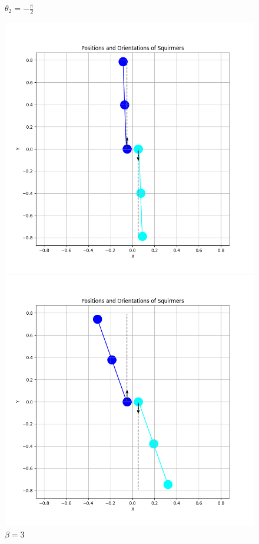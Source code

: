 \documentclass{article}
\begin{document}
\begin{figure}[H]
    \centering
    \textbf{$\theta_2 = -\frac{\pi}{2}$}\par\medskip
    \begin{minipage}{0.49\textwidth}
        \includegraphics[width=1.1\textwidth]{graphs/simulations/sim_sq_sq/betam3/mpi_2_.png}
        \caption{\footnotesize $\beta = -3$}
    \end{minipage}\hfill
    \begin{minipage}{0.49\textwidth}
        \includegraphics[width=1.1\textwidth]{graphs/simulations/sim_sq_sq/beta3/mpi_2_.png}
        \caption{\footnotesize $\beta = 3$}
    \end{minipage}
\end{figure}
\end{document}
